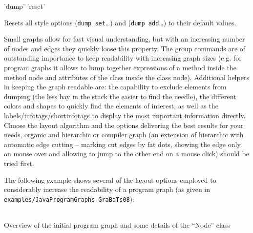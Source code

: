 \begin{rail}
  'dump' 'reset'
\end{rail}
Resets all style options (\texttt{dump set}\dots) and (\texttt{dump add}\dots) to their default values.


\begin{note}
Small graphs allow for fast visual understanding, but with an increasing number of nodes and edges they quickly loose this property.
The group commands are of outstanding importance to keep readability with increasing graph sizes
(e.g. for program graphs it allows to lump together expressions of a method inside the method node and attributes of the class inside the class node).
Additional helpers in keeping the graph readable are: 
the capability to exclude elements from dumping (the less hay in the stack the easier to find the needle),
the different colors and shapes to quickly find the elements of interest,
as well as the labels/infotags/shortinfotags to display the most important information directly. 
Choose the layout algorithm and the options delivering the best results for your needs, organic and hierarchic or compiler graph 
(an extension of hierarchic with automatic edge cutting -- marking cut edges by fat dots, showing the edge only on mouse over and allowing to jump to the other end on a mouse click)
should be tried first.
\end{note}

The following example shows several of the layout options employed to considerably increase the readability of a program graph (as given in \texttt{examples/JavaProgramGraphs-GraBaTs08}):
\begin{center}
    \hfill {}\\
  {\small Overview of the initial program graph and some details of the ``Node'' class}
\end{center}


